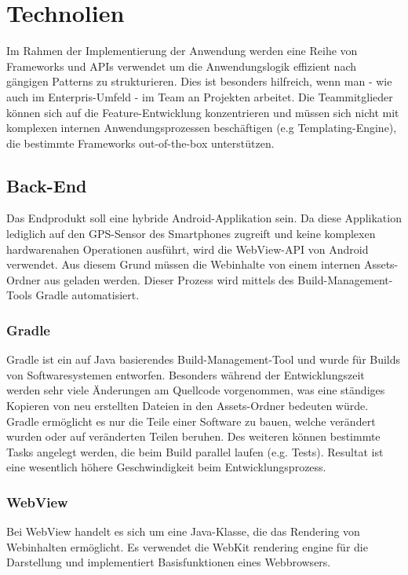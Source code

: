 \chapter{Technolien}
\label{chap:technologien}

Im Rahmen der Implementierung der Anwendung werden eine Reihe von Frameworks und APIs verwendet um die Anwendungslogik effizient nach gängigen Patterns zu strukturieren. Dies ist besonders hilfreich, wenn man - wie auch im Enterpris-Umfeld - im Team an Projekten arbeitet. Die Teammitglieder können sich auf die Feature-Entwicklung konzentrieren und müssen sich nicht mit komplexen internen Anwendungsprozessen beschäftigen (e.g Templating-Engine), die bestimmte Frameworks out-of-the-box unterstützen.


\section{Back-End}
\label{sec:backend}
Das Endprodukt soll eine hybride Android-Applikation sein. Da diese Applikation lediglich auf den GPS-Sensor des Smartphones zugreift und keine komplexen hardwarenahen Operationen ausführt, wird die WebView-API von Android verwendet. Aus diesem Grund müssen die Webinhalte von einem internen Assets-Ordner aus geladen werden. Dieser Prozess wird mittels des Build-Management-Tools Gradle automatisiert. 

\subsection{Gradle}
\label{subsec:gradle}
Gradle ist ein auf Java basierendes Build-Management-Tool und wurde für Builds von Softwaresystemen entworfen. Besonders während der Entwicklungszeit werden sehr viele Änderungen am Quellcode vorgenommen, was eine ständiges Kopieren von neu erstellten Dateien in den Assets-Ordner bedeuten würde. Gradle ermöglicht es nur die Teile einer Software zu bauen, welche verändert wurden oder auf veränderten Teilen beruhen. Des weiteren können bestimmte Tasks angelegt werden, die beim Build parallel laufen (e.g. Tests). Resultat ist eine wesentlich höhere Geschwindigkeit beim Entwicklungsprozess.

\subsection{WebView}
\label{subsec:webview}
Bei WebView handelt es sich um eine Java-Klasse, die das Rendering von Webinhalten ermöglicht. Es verwendet die WebKit rendering engine für die Darstellung und implementiert Basisfunktionen eines Webbrowsers.



